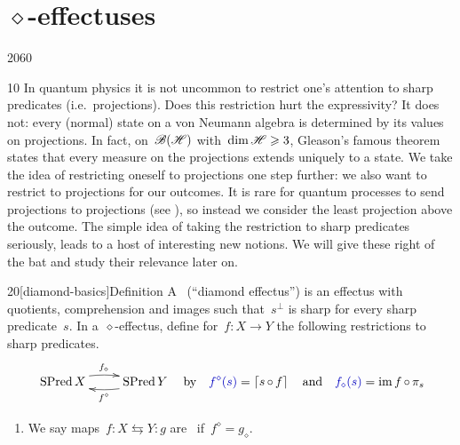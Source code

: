 \section{\texorpdfstring{$\diamond$-effectuses}{%
                    diamond-effectuses}}
\begin{parsec}{2060}%
\begin{point}{10}%
In quantum physics it is not uncommon to restrict one's attention
    to sharp predicates (i.e.~projections).
Does this restriction hurt the expressivity?
It does not: every (normal) state on a von Neumann algebra
        is determined by its values on projections.
In fact, on~$\mathscr{B}(\mathscr{H})$ with~$\dim \mathscr{H} \geqslant 3$,
    Gleason's famous theorem states that every
    measure on the projections extends uniquely to a state.
We take the idea of restricting oneself to projections
    one step further: we also want to restrict to projections
    for our outcomes.
It is rare for quantum processes to send projections to projections
    (see ),
    so instead we consider the least projection above the outcome.
The simple idea of taking the restriction to sharp predicates
    seriously, leads to a host of interesting new notions.
We will give these right of the bat and study their relevance later on.
\end{point}
\begin{point}{20}[diamond-basics]{Definition}%
    A~ (``diamond effectus'')
    is an effectus with quotients, comprehension and images
    such that~$s^\perp$ is sharp for every sharp predicate~$s$.
In a~$\diamond$-effectus,
    define for~$f\colon X \to Y$
    the following restrictions to sharp predicates.
    \begin{equation*}
        \xymatrix{
            \SPred X  \ar@/^/[r]^{f_\diamond}
            & \SPred Y \ar@/^/[l]^{f^\diamond}}
            \quad \text{by} \quad
            \Define{f^\diamond(s)} = \ceil{s \after f}
            \index{*diamond1@$(\ )^\diamond$, $(\ )_\diamond$}
            \quad
            \text{and}
            \quad
            \Define{f_\diamond(s)} = \IM f \after \pi_s
    \end{equation*}
    \begin{enumerate}
        \item
    We say maps~$f \colon X \leftrightarrows Y\colon g$
        are~
        if~$f^\diamond = g_\diamond$.

\end{enumerate}
\end{point}
\end{parsec}
